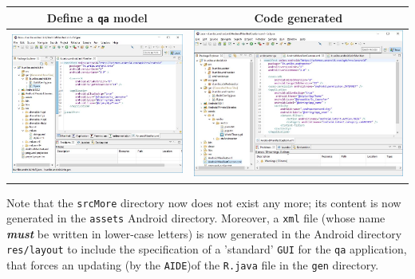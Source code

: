\medskip 
\begin{tabular}{|c|c|}
\hline 
Define a \texttt{qa} model & Code generated \\ 
\hline 
\includegraphics[scale = 0.35]{./img/qainitAndroid2.jpg}
  &  \includegraphics[scale = 0.30]{./img/qainitAndroid3.jpg} \\
\hline 
\end{tabular}
\medskip 

Note that the \texttt{srcMore} directory now does not exist any more; its content is now generated in the \texttt{assets} Android directory.
Moreover, a \texttt{xml} file (whose name \textbf{\textit{must}} be written in lower-case letters) is now generated in the Android directory \texttt{res/layout} to include the specification of a 'standard' \texttt{GUI} for the \texttt{qa} application, that forces an updating (by the  \texttt{AIDE})of the \texttt{R.java} file in the \texttt{gen} directory.
  
